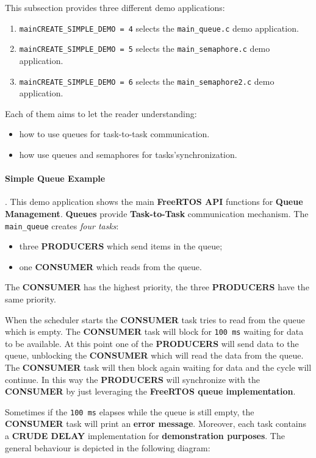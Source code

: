 This subsection provides three different demo applications:
\begin{enumerate}
    \item \texttt{mainCREATE\_SIMPLE\_DEMO = 4} selects the \texttt{main\_queue.c} demo application.
    \item \texttt{mainCREATE\_SIMPLE\_DEMO = 5} selects the \texttt{main\_semaphore.c} demo application.
    \item \texttt{mainCREATE\_SIMPLE\_DEMO = 6} selects the \texttt{main\_semaphore2.c} demo application.
\end{enumerate}
Each of them aims to let the reader understanding:
\begin{itemize}
    \item how to use queues for task-to-task communication. 
    \item how use queues and semaphores for tasks'synchronization.
\end{itemize}

\paragraph{Simple Queue Example}. 
\label{par: Simple Queue Example}
This demo application shows the main \textbf{FreeRTOS API} functions for \textbf{Queue Management}. \textbf{Queues} provide \textbf{Task-to-Task} communication mechanism.
The \texttt{main\_queue} creates \textit{four tasks}:
\begin{itemize}
    \item three \textbf{PRODUCERS} which send items in the queue;
    \item one \textbf{CONSUMER} which reads from the queue.
\end{itemize}
The \textbf{CONSUMER} has the highest priority, the three \textbf{PRODUCERS} have the same priority.

When the scheduler starts the \textbf{CONSUMER} task tries to read from the queue which is empty. The \textbf{CONSUMER} task will block for \texttt{100 ms} waiting for data to be available. At this point one of the \textbf{PRODUCERS} will send data to the queue, unblocking the \textbf{CONSUMER} which will read the data from the queue. The \textbf{CONSUMER} task will then block again waiting for data and the cycle will continue. In this way the \textbf{PRODUCERS} will synchronize with the \textbf{CONSUMER} by just leveraging the \textbf{FreeRTOS queue implementation}.

Sometimes if the \texttt{100 ms} elapses while the queue is still empty, the \textbf{CONSUMER} task will print an \textbf{error message}. Moreover, each task contains a \textbf{CRUDE DELAY} implementation for \textbf{demonstration purposes}.
The general behaviour is depicted in the following diagram:

